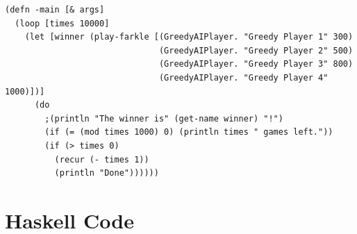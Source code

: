\documentclass{article}
\begin{document}
\begin{verbatim}
(defn -main [& args]
  (loop [times 10000]
    (let [winner (play-farkle [(GreedyAIPlayer. "Greedy Player 1" 300)
                               (GreedyAIPlayer. "Greedy Player 2" 500)
                               (GreedyAIPlayer. "Greedy Player 3" 800)
                               (GreedyAIPlayer. "Greedy Player 4" 1000)])]
      (do
        ;(println "The winner is" (get-name winner) "!")
        (if (= (mod times 1000) 0) (println times " games left."))
        (if (> times 0)
          (recur (- times 1))
          (println "Done"))))))
\end{verbatim}

\section{Haskell Code}
\end{document}
